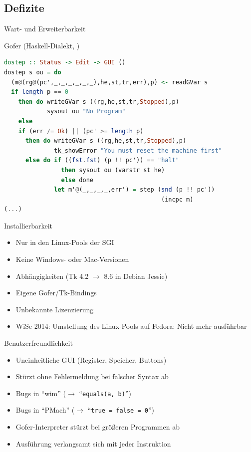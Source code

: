\documentclass{beamer}
\begin{document}
\subsection*{Defizite}
\begin{frame}[fragile]{Wart- und Erweiterbarkeit}
	\begin{block}{Gofer (Haskell-Dialekt, )}
	\begin{lstlisting}[language=Haskell]
dostep :: Status -> Edit -> GUI ()
dostep s ou = do
  (m@(rg@(pc',_,_,_,_,_,_),he,st,tr,err),p) <- readGVar s
  if length p == 0
    then do writeGVar s ((rg,he,st,tr,Stopped),p)
            sysout ou "No Program"
    else
    if (err /= Ok) || (pc' >= length p)
      then do writeGVar s ((rg,he,st,tr,Stopped),p)
              tk_showError "You must reset the machine first"
      else do if ((fst.fst) (p !! pc')) == "halt"
                then sysout ou (varstr st he)
                else done
              let m'@(_,_,_,_,err') = step (snd (p !! pc'))
                                            (incpc m)
(...)
	\end{lstlisting}
	\end{block}
\end{frame}

\begin{frame}{Installierbarkeit}
	\begin{itemize}
	\item Nur in den Linux-Pools der SGI
	\item Keine Windows- oder Mac-Versionen
	\item Abhängigkeiten (Tk 4.2 $\rightarrow$ 8.6 in Debian Jessie)
	\item Eigene Gofer/Tk-Bindings
	\item Unbekannte Lizenzierung
	\item WiSe 2014: Umstellung des Linux-Pools auf Fedora:
		Nicht mehr ausführbar
	\end{itemize}
\end{frame}

\begin{frame}{Benutzerfreundlichkeit}
	\begin{itemize}
	\item Uneinheitliche GUI (Register, Speicher, Buttons)
	\item Stürzt ohne Fehlermeldung bei falscher Syntax ab
	\item Bugs in \enquote{wim} ($\rightarrow$ \enquote{\texttt{equals(a, b)}})
	\item Bugs in \enquote{PMach} ($\rightarrow$ \enquote{\texttt{true = false = 0}})
	\item Gofer-Interpreter stürzt bei größeren Programmen ab
	\item Ausführung verlangsamt sich mit jeder Instruktion
	\end{itemize}
\end{frame}
\end{document}
